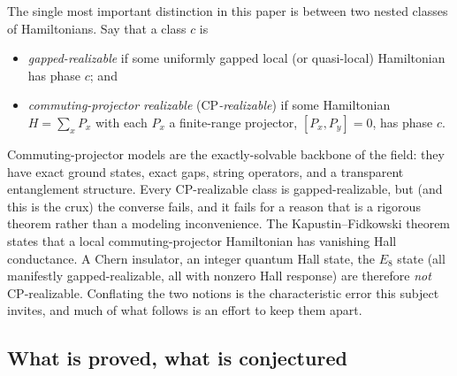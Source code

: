 \documentclass[12pt]{article}
\newcommand{\CP}{\mathrm{CP}}                    %
\theoremstyle{definition}
\theoremstyle{remark}
\begin{document}
The single most important distinction in this paper is between two nested classes of
Hamiltonians. Say that a class $c$ is
\begin{itemize}
  \item \emph{gapped-realizable} if some uniformly gapped local (or quasi-local) Hamiltonian
        has phase $c$; and
  \item \emph{commuting-projector realizable} (\emph{$\CP$-realizable}) if some Hamiltonian
        $H=\sum_x P_x$ with each $P_x$ a finite-range projector, $[P_x,P_y]=0$, has phase
        $c$.
\end{itemize}
Commuting-projector models are the exactly-solvable backbone of the field: they have exact
ground states, exact gaps, string operators, and a transparent entanglement structure. Every
$\CP$-realizable class is gapped-realizable, but (and this is the crux) the converse
fails, and it fails for a reason that is a rigorous theorem rather than a modeling
inconvenience. The Kapustin--Fidkowski theorem \cite{kapustin-fidkowski} states that a local
commuting-projector Hamiltonian has vanishing Hall conductance. A Chern insulator, an
integer quantum Hall state, the $E_8$ state (all manifestly gapped-realizable, all with
nonzero Hall response) are therefore \emph{not} $\CP$-realizable. Conflating the two
notions is the characteristic error this subject invites, and much of what follows is an
effort to keep them apart.

\subsection{What is proved, what is conjectured}
\end{document}
